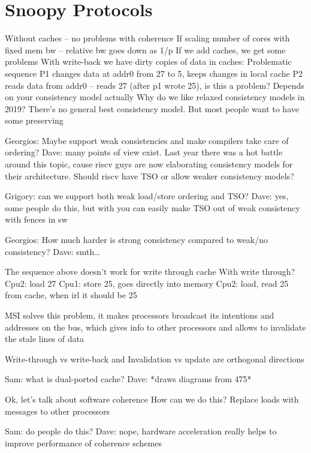 




\section{Snoopy Protocols}

Without caches – no problems with coherence
If scaling number of cores with fixed mem bw – relative bw goes down as 1/p
If we add caches, we get some problems
With write-back we have dirty copies of data in caches:
Problematic sequence
P1 changes data at addr0 from 27 to 5, keeps changes in local cache
P2 reads data from addr0 – reads 27 (after p1 wrote 25), is this a problem? Depends on your consistency model actually
Why do we like relaxed consistency models in 2019? There’s no general best consistency model. But most people want to have some preserving

Georgios: Maybe support weak consistencies and make compilers take care of ordering?
Dave: many points of view exist. Last year there was a hot battle around this topic, cause riscv guys are now elaborating consistency models for their architecture. Should riscv have TSO or allow weaker consistency models?

Grigory: can we support both weak load/store ordering and TSO?
Dave: yes, some people do this, but with you can easily make TSO out of weak consistency with fences in sw

Georgios: How much harder is strong consistency compared to weak/no consistency?
Dave: smth…

The sequence above doesn’t work for write through cache
With write through?
Cpu2: load 27
Cpu1: store 25, goes directly into memory
Cpu2: load, read 25 from cache, when irl it should be 25

MSI solves this problem, it makes processors broadcast its intentions and addresses on the bus, which gives info to other processors and allows to invalidate the stale lines of data

Write-through vs write-back and Invalidation vs update are orthogonal directions

Sam: what is dual-ported cache?
Dave: *draws diagrams from 475*

Ok, let’s talk about software coherence
How can we do this?
Replace loads with messages to other processors


Sam: do people do this?
Dave: nope, hardware acceleration really helps to improve performance of coherence schemes

